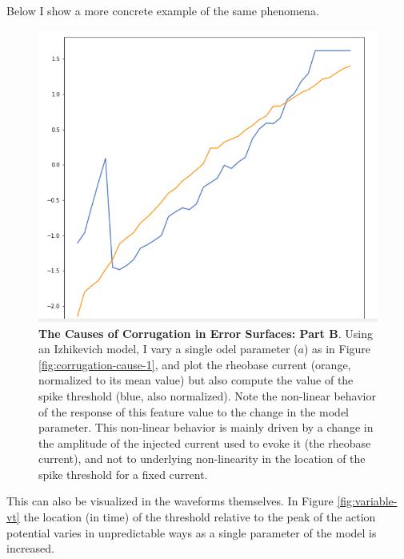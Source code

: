 Below I show a more concrete example of the same phenomena.
\begin{figure}
\begin{center}
\includegraphics[]{figures/rh_vs_vt.png}
\caption[Causes of corrugation (2)]{\textbf{The Causes of Corrugation in Error Surfaces: Part B}.
Using an Izhikevich model, I vary a single odel parameter ($a$) as in Figure \ref{fig:corrugation-cause-1}, and plot the rheobase current (orange, normalized to its mean value) but also compute the value of the spike threshold (blue, also normalized).
Note the non-linear behavior of the response of this feature value to the change in the model parameter.
This non-linear behavior is mainly driven by a change in the amplitude of the injected current used to evoke it (the rheobase current), and not to underlying non-linearity in the location of the spike threshold for a fixed current.}
\label{fig:corrugation-cause-2}
\end{center}
\end{figure}

This can also be visualized in the waveforms themselves.
In Figure \ref{fig:variable-vt} the location (in time) of the threshold relative to the peak of the action potential varies in unpredictable ways as a single parameter of the model is increased.

